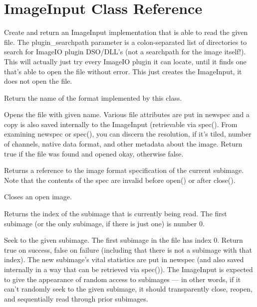 \section{{\kw ImageInput} Class Reference}

Create and return an {\kw ImageInput} implementation that is able
to read the given file.  The {\kw plugin_searchpath} parameter is a
colon-separated list of directories to search for ImageIO plugin
DSO/DLL's (not a searchpath for the image itself!).  This will
actually just try every ImageIO plugin it can locate, until it
finds one that's able to open the file without error.  This just
creates the {\kw ImageInput}, it does not open the file.
\apiend

Return the name of the format implemented by this class.
\apiend

Opens the file with given name.  Various file attributes are put in
{\kw newspec} and a copy is also saved internally to the
{\kw ImageInput} (retrievable via {\kw spec()}.  From examining
{\kw newspec} or {\kw spec()}, you can discern the resolution, if it's
tiled, number of channels, native data format, and other metadata about
the image.  Return {\kw true} if the file was found and opened okay,
otherwise {\kw false}.
\apiend

Returns a reference to the image format specification of the
current subimage.  Note that the contents of the spec are
invalid before {\kw open()} or after {\kw close()}.
\apiend

Closes an open image.
\apiend


Returns the index of the subimage that is currently being read.
The first subimage (or the only subimage, if there is just one) is
number 0.
\apiend


Seek to the given subimage.  The first subimage in the file has index 0.
Return {\kw true} on success, {\kw false} on failure (including that
there is not a subimage with that index).  The new subimage's vital
statistics are put in {\kw newspec} (and also saved internally in a way
that can be retrieved via {\kw spec()}).  The {\kw ImageInput} is
expected to give the appearance of random access to subimages --- in
other words, if it can't randomly seek to the given subimage, it should
transparently close, reopen, and sequentially read through prior
subimages.
\apiend

